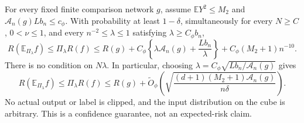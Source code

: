 \begin{theorem}
\label{thm:all-width-raw}
For every fixed finite comparison network $g$, assume
$\mathbb E Y^2\le M_2$ and
$\mathcal A_n(g)L b_n\le c_\phi$.
With probability at least $1-\delta$, simultaneously for every
$N\ge C$, $0<\nu\le1$, and every $n^{-2}\le\lambda\le1$ satisfying
$\lambda\ge C_\phi b_n$,
\[
 R(\mathbb E_{\Pi_\lambda}f)\le\Pi_\lambda R(f)
 \le R(g)+C_\phi\left\{\lambda\mathcal A_n(g)
                             +\frac{L b_n}{\lambda}\right\}
       +C_\phi(M_2+1)n^{-10}.                          \tag{AW3}
\]
There is no condition on $N\lambda$. In particular, choosing
$\lambda=C_\phi\sqrt{L b_n/\mathcal A_n(g)}$ gives
\[
 R(\mathbb E_{\Pi_\lambda}f)\le\Pi_\lambda R(f)
 \le R(g)+\widetilde O_\phi\left(
       \sqrt{\frac{(d+1)(M_2+1)\mathcal A_n(g)}{n\delta}}\right).
                                                               \tag{AW4}
\]
No actual output or label is clipped, and the input distribution on the
cube is arbitrary. This is a confidence guarantee, not an expected-risk
claim.
\end{theorem}
